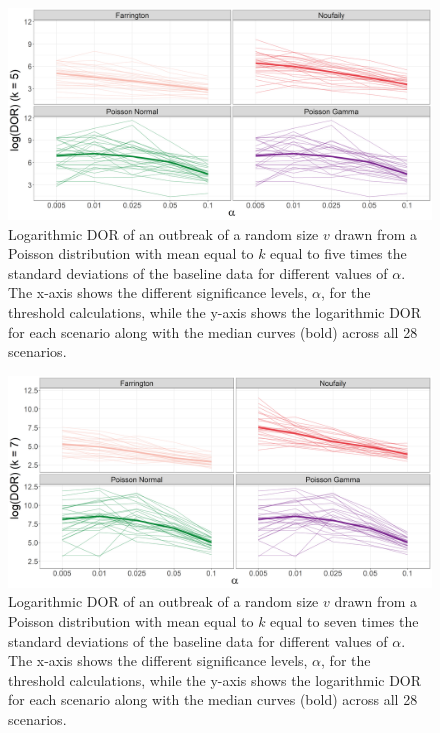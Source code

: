 \documentclass[preprint, 3p, authoryear]{elsarticle} %
\begin{document}
\begin{figure}[H]
\includegraphics[width=1\linewidth]{../../figures/logDORk5} \caption{Logarithmic DOR of an outbreak of a random size \(v\) drawn from a Poisson distribution with mean equal to \(k\) equal to five times the standard deviations of the baseline data for different values of \(\alpha\). The x-axis shows the different significance levels, \(\alpha\), for the threshold calculations, while the y-axis shows the logarithmic DOR for each scenario along with the median curves (bold) across all 28 scenarios.}\label{fig:logDORk5}
\end{figure}



\begin{figure}[H]
\includegraphics[width=1\linewidth]{../../figures/logDORk7} \caption{Logarithmic DOR of an outbreak of a random size \(v\) drawn from a Poisson distribution with mean equal to \(k\) equal to seven times the standard deviations of the baseline data for different values of \(\alpha\). The x-axis shows the different significance levels, \(\alpha\), for the threshold calculations, while the y-axis shows the logarithmic DOR for each scenario along with the median curves (bold) across all 28 scenarios.}\label{fig:logDORk7}
\end{figure}
\end{document}
